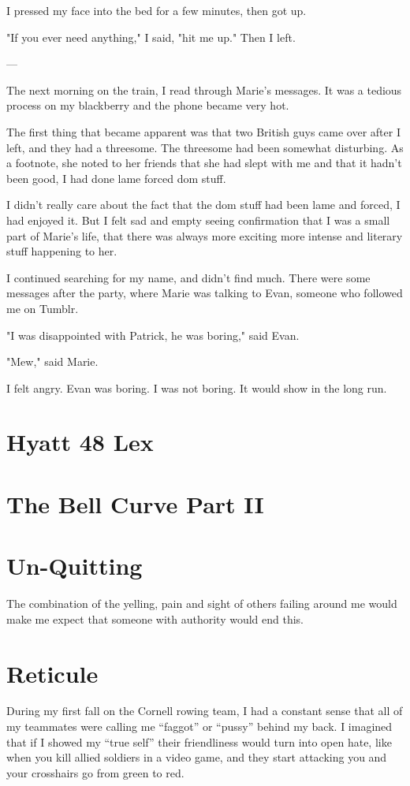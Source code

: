 \documentclass[12pt]{article}
\begin{document}
I pressed my face into the bed for a few minutes, then got up.

"If you ever need anything," I said, "hit me up."  Then I left.

---

The next morning on the train, I read through Marie's messages.  It was a
tedious process on my blackberry and the phone became very hot. 

The first thing that became apparent was that two British guys came over
after I left, and they had a threesome.  The threesome had been somewhat
disturbing.  As a footnote, she noted to her friends that she had slept with me
and that it hadn't been good, I had done lame forced dom stuff.

I didn't really care about the fact that the dom stuff had been lame and forced,
I had enjoyed it.  But I felt sad and empty seeing confirmation that I was a small part of
Marie's life, that there was always more exciting more intense and literary
stuff happening to her.

I continued searching for my name, and didn't find much.  There were some
messages after the party, where Marie was talking to Evan, someone who followed
me on Tumblr.

"I was disappointed with Patrick, he was boring," said Evan.

"Mew," said Marie.

I felt angry.  Evan was boring.  I was not boring.  It would show in the long
run. 
            
\section{Hyatt 48 Lex}

\section{The Bell Curve Part II}


\section{Un-Quitting}
The combination of the yelling, pain and sight of others failing around me would
make me expect that someone with authority would end this.


\section{Reticule}
During my first fall on the Cornell rowing team, I had a constant sense that
all of my teammates were calling me ``faggot'' or ``pussy'' behind my back.  I
imagined that if I showed my ``true self'' their friendliness would turn into
open hate, like when you kill allied soldiers in a video game, and they start
attacking you and your crosshairs go from green to red.  
\end{document}
